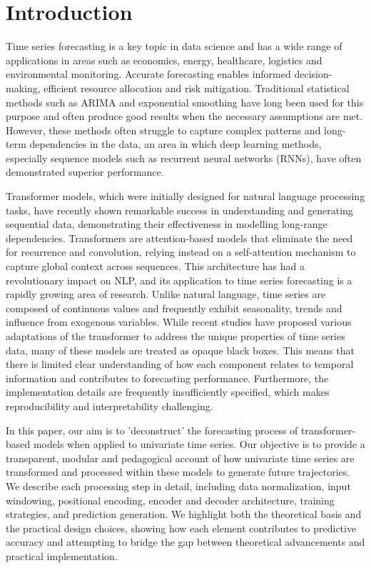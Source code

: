 \documentclass[algorithms,article,submit,pdftex,moreauthors]{Definitions/mdpi}
\begin{document}
\section{Introduction} \label{sec:intro}

Time series forecasting is a key topic in data science and has a wide range of applications in areas such as economics, energy, healthcare, logistics and environmental monitoring. Accurate forecasting enables informed decision-making, efficient resource allocation and risk mitigation. Traditional statistical methods such as ARIMA and exponential smoothing have long been used for this purpose and often produce good results when the necessary assumptions are met. However, these methods often struggle to capture complex patterns and long-term dependencies in the data, an area in which deep learning methods, especially sequence models such as recurrent neural networks (RNNs), have often demonstrated superior performance.

Transformer models, which were initially designed for natural language processing tasks, have recently shown remarkable success in understanding and generating sequential data, demonstrating their effectiveness in modelling long-range dependencies. Transformers are attention-based models that eliminate the need for recurrence and convolution, relying instead on a self-attention mechanism to capture global context across sequences. This architecture has had a revolutionary impact on NLP, and its application to time series forecasting is a rapidly growing area of research. Unlike natural language, time series are composed of continuous values and frequently exhibit seasonality, trends and influence from exogenous variables. While recent studies have proposed various adaptations of the transformer to address the unique properties of time series data, many of these models are treated as opaque black boxes. This means that there is limited clear understanding of how each component relates to temporal information and contributes to forecasting performance. Furthermore, the implementation details are frequently insufficiently specified, which makes reproducibility and interpretability challenging.

In this paper, our aim is to 'deconstruct' the forecasting process of transformer-based models when applied to univariate time series. Our objective is to provide a transparent, modular and pedagogical account of how univariate time series are transformed and processed within these models to generate future trajectories. We describe each processing step in detail, including data normalization, input windowing, positional encoding, encoder and decoder architecture, training strategies, and prediction generation. We highlight both the theoretical basis and the practical design choices, showing how each element contributes to predictive accuracy and attempting to bridge the gap between theoretical advancements and practical implementation.
\end{document}
